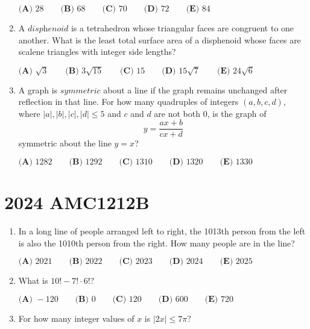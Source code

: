 \documentclass{article}
\begin{document}
\begin{enumerate}[label=\arabic*., itemsep=0.5em]
\(\textbf{(A) } 28 \qquad \textbf{(B) } 68 \qquad \textbf{(C) } 70 \qquad \textbf{(D) } 72 \qquad \textbf{(E) } 84\)\par \vspace{0.5em}\item A \(\textit{disphenoid}\) is a tetrahedron whose triangular faces are congruent to one another. What is the least total surface area of a disphenoid whose faces are scalene triangles with integer side lengths?

\(\textbf{(A) }\sqrt{3}\qquad\textbf{(B) }3\sqrt{15}\qquad\textbf{(C) }15\qquad\textbf{(D) }15\sqrt{7}\qquad\textbf{(E) }24\sqrt{6}\)\par \vspace{0.5em}\item A graph is \(\textit{symmetric}\) about a line if the graph remains unchanged after reflection in that line. For how many quadruples of integers \((a,b,c,d)\), where \(|a|,|b|,|c|,|d|\le5\) and \(c\) and \(d\) are not both \(0\), is the graph of 
\begin{equation*}
y=\frac{ax+b}{cx+d}
\end{equation*}
symmetric about the line \(y=x\)?

\(\textbf{(A) }1282\qquad\textbf{(B) }1292\qquad\textbf{(C) }1310\qquad\textbf{(D) }1320\qquad\textbf{(E) }1330\)\par \vspace{0.5em}\end{enumerate}\newpage\section*{2024 AMC1212B}\begin{enumerate}[label=\arabic*., itemsep=0.5em]\item In a long line of people arranged left to right, the 1013th person from the left is also the 1010th person from the right. How many people are in the line?

\(\textbf{(A) } 2021 \qquad\textbf{(B) } 2022 \qquad\textbf{(C) } 2023 \qquad\textbf{(D) } 2024 \qquad\textbf{(E) } 2025\)\par \vspace{0.5em}\item What is \(10! - 7! \cdot 6!\)?

\(\textbf{(A) }-120 \qquad\textbf{(B) }0 \qquad\textbf{(C) }120 \qquad\textbf{(D) }600 \qquad\textbf{(E) }720 \qquad\)\par \vspace{0.5em}\item For how many integer values of \(x\) is \(|2x|\leq 7\pi?\)


\end{enumerate}
\end{document}
